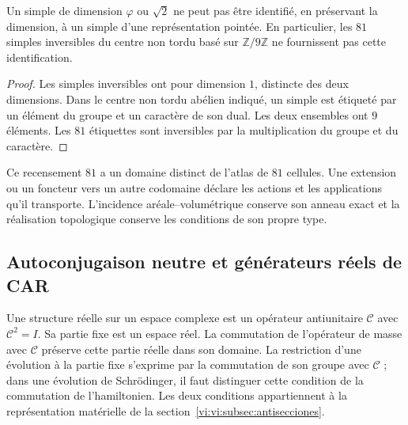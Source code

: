 \begin{proposition}
\label{vi:vi:prop:apuntada}
Un simple de dimension $\varphi$ ou $\sqrt2$ ne peut pas être identifié,
en préservant la dimension, à un simple d’une représentation pointée.
En particulier, les $81$ simples inversibles du centre non tordu
basé sur $\mathbb Z/9\mathbb Z$ ne fournissent pas cette identification.
\end{proposition}
\begin{proof}
Les simples inversibles ont pour dimension $1$, distincte des deux
dimensions. Dans le centre non tordu abélien indiqué, un simple est
étiqueté par un élément du groupe et un caractère de son dual. Les deux
ensembles ont $9$ éléments. Les $81$ étiquettes sont inversibles
par la multiplication du groupe et du caractère.
\end{proof}

Ce recensement $81$ a un domaine distinct de l’atlas de $81$ cellules.
Une extension ou un foncteur vers un autre codomaine déclare les actions
et les applications qu’il transporte. L’incidence aréale--volumétrique conserve
son anneau exact et la réalisation topologique conserve les conditions
de son propre type.

\subsection{Autoconjugaison neutre et générateurs réels de CAR}
\label{vi:vi:subsec:majorana-categorias}

Une structure réelle sur un espace complexe est un opérateur antiunitaire
$\mathcal C$ avec $\mathcal C^2=I$. Sa partie fixe est un espace réel.
La commutation de l’opérateur de masse avec $\mathcal C$ préserve cette
partie réelle dans son domaine. La restriction d’une évolution à la partie
fixe s’exprime par la commutation de son groupe avec $\mathcal C$ ;
dans une évolution de Schr\"odinger, il faut distinguer cette condition
de la commutation de l’hamiltonien. Les deux conditions appartiennent à la
représentation matérielle de la section~\ref{vi:vi:subsec:antisecciones}.

